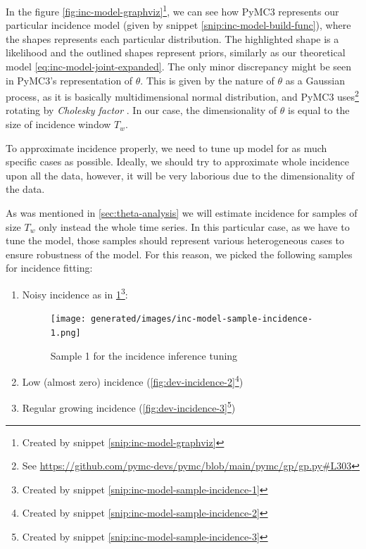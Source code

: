 \documentclass[
  digital, %
  oneside, %
  lof,     %
  lot,     %
]{fithesis4}
\begin{document}
In the figure \ref{fig:inc-model-graphviz}\footnote{Created by snippet \ref{snip:inc-model-graphviz}},
we can see how PyMC3 represents our particular incidence model (given by snippet \ref{snip:inc-model-build-func}),
where the shapes represents each particular distribution.
The highlighted shape is a likelihood and the outlined 
shapes represent priors, similarly as our theoretical 
model \ref{eq:inc-model-joint-expanded}.
The only minor discrepancy might be seen in PyMC3's representation of $\theta$.
This is given by the nature of $\theta$ as a Gaussian process, as it is 
basically multidimensional normal distribution,
and PyMC3 uses\footnote{See \url{https://github.com/pymc-devs/pymc/blob/main/pymc/gp/gp.py\#L303}} rotating by \textit{Cholesky 
factor} \cite[Chapter 7]{murphy2021}.
In our case, the dimensionality of $\theta$ is equal to 
the size of incidence window $T_w$.

To approximate incidence properly, we need to tune up model for
as much specific cases as possible. Ideally, we should try to approximate
whole incidence upon all the data, however, it will be very laborious 
due to the dimensionality of the data.

As was mentioned in \autoref{sec:theta-analysis} we will 
estimate incidence for samples of size $T_w$ only instead the whole time series.
In this particular case, as we have to tune the model, 
those samples should represent various heterogeneous cases to ensure 
robustness of the model.
For this reason, we picked the following samples for incidence fitting:

\begin{enumerate}
  \item Noisy incidence as in \ref{fig:dev-incidence-1}\footnote{Created by snippet \ref{snip:inc-model-sample-incidence-1}}:
  \begin{figure}[H]
    \begin{center}
      \texttt{[image: generated/images/inc-model-sample-incidence-1.png]}
    \end{center}
    \caption{Sample 1 for the incidence inference tuning}
    \label{fig:dev-incidence-1}
  \end{figure}
  \item Low (almost zero) incidence (\ref{fig:dev-incidence-2}\footnote{Created by snippet \ref{snip:inc-model-sample-incidence-2}})
  \item Regular growing incidence (\ref{fig:dev-incidence-3}\footnote{Created by snippet \ref{snip:inc-model-sample-incidence-3}})
\end{enumerate}
\end{document}
